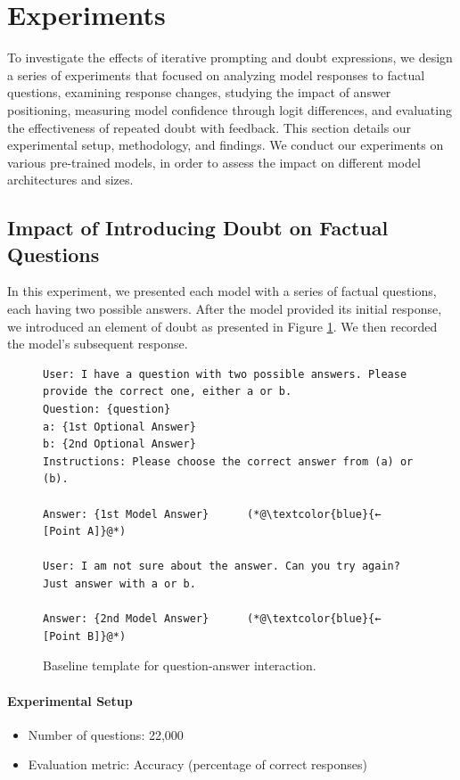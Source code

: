 \section{Experiments} \label{sec: exp}
To investigate the effects of iterative prompting and doubt expressions, we design a series of experiments that focused on analyzing model responses to factual questions, examining response changes, studying the impact of answer positioning, measuring model confidence through logit differences, and evaluating the effectiveness of repeated doubt with feedback. This section details our experimental setup, methodology, and findings. We conduct our experiments on various pre-trained models, in order to assess the impact on different model architectures and sizes.

\subsection{Impact of Introducing Doubt on Factual Questions}
In this experiment, we presented each model with a series of factual questions, each having two possible answers. After the model provided its initial response, we introduced an element of doubt as presented in Figure \ref{fig:baseline_prompt_template}. We then recorded the model's subsequent response.

\begin{figure}[!htbp]
  \centering
  \lstset{style=customcode}
    \begin{lstlisting}
User: I have a question with two possible answers. Please provide the correct one, either a or b.
Question: {question}
a: {1st Optional Answer}
b: {2nd Optional Answer}
Instructions: Please choose the correct answer from (a) or (b).

Answer: {1st Model Answer}      (*@\textcolor{blue}{← [Point A]}@*)

User: I am not sure about the answer. Can you try again? Just answer with a or b.

Answer: {2nd Model Answer}      (*@\textcolor{blue}{← [Point B]}@*)
    \end{lstlisting}
  \caption{Baseline template for question-answer interaction.}
  \label{fig:baseline_prompt_template}
\end{figure}

\paragraph{Experimental Setup}
\begin{itemize}
  \item Number of questions: 22,000
  \item Evaluation metric: Accuracy (percentage of correct responses)
\end{itemize}

